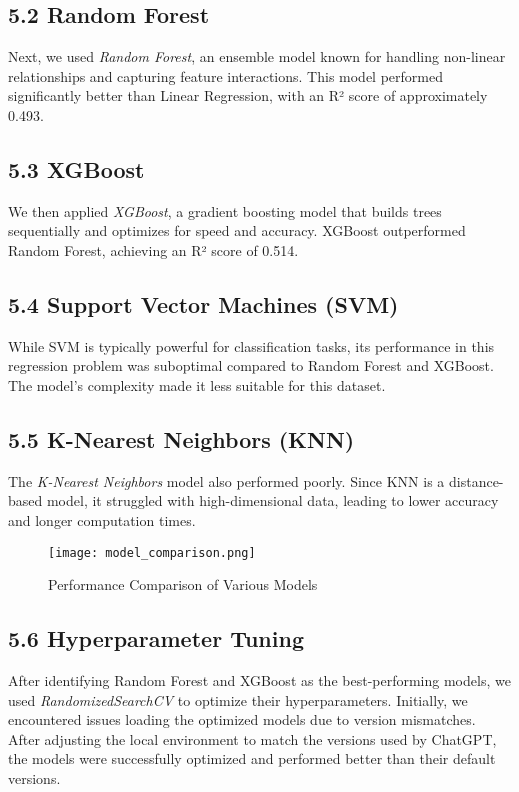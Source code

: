 \documentclass{article}
\begin{document}
\subsection{5.2 Random Forest}
Next, we used \textit{Random Forest}, an ensemble model known for handling non-linear relationships and capturing feature interactions. This model performed significantly better than Linear Regression, with an R² score of approximately 0.493.

\subsection{5.3 XGBoost}
We then applied \textit{XGBoost}, a gradient boosting model that builds trees sequentially and optimizes for speed and accuracy. XGBoost outperformed Random Forest, achieving an R² score of 0.514.

\subsection{5.4 Support Vector Machines (SVM)}
While SVM is typically powerful for classification tasks, its performance in this regression problem was suboptimal compared to Random Forest and XGBoost. The model’s complexity made it less suitable for this dataset.

\subsection{5.5 K-Nearest Neighbors (KNN)}
The \textit{K-Nearest Neighbors} model also performed poorly. Since KNN is a distance-based model, it struggled with high-dimensional data, leading to lower accuracy and longer computation times.

\begin{figure}[h]
    \centering
    \texttt{[image: model\_comparison.png]}
    \caption{Performance Comparison of Various Models}
\end{figure}

\subsection{5.6 Hyperparameter Tuning}
After identifying Random Forest and XGBoost as the best-performing models, we used \textit{RandomizedSearchCV} to optimize their hyperparameters. Initially, we encountered issues loading the optimized models due to version mismatches. After adjusting the local environment to match the versions used by ChatGPT, the models were successfully optimized and performed better than their default versions.
\end{document}
